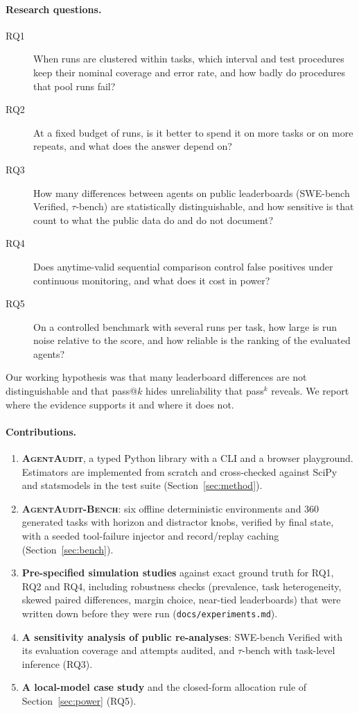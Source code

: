 \paragraph{Research questions.}
\begin{description}
\item[RQ1] When runs are clustered within tasks, which interval and test procedures keep their nominal coverage and error rate, and how badly do procedures that pool runs fail?
\item[RQ2] At a fixed budget of runs, is it better to spend it on more tasks or on more repeats, and what does the answer depend on?
\item[RQ3] How many differences between agents on public leaderboards (SWE-bench Verified, $\tau$-bench) are statistically distinguishable, and how sensitive is that count to what the public data do and do not document?
\item[RQ4] Does anytime-valid sequential comparison control false positives under continuous monitoring, and what does it cost in power?
\item[RQ5] On a controlled benchmark with several runs per task, how large is run noise relative to the score, and how reliable is the ranking of the evaluated agents?
\end{description}
Our working hypothesis was that many leaderboard differences are not distinguishable and that pass@$k$ hides unreliability that pass$^k$ reveals. We report where the evidence supports it and where it does not.

\paragraph{Contributions.}
\begin{enumerate}
\item \textbf{\textsc{AgentAudit}}, a typed Python library with a CLI and a browser playground. Estimators are implemented from scratch and cross-checked against SciPy and statsmodels in the test suite (Section~\ref{sec:method}).
\item \textbf{\textsc{AgentAudit-Bench}}: six offline deterministic environments and 360 generated tasks with horizon and distractor knobs, verified by final state, with a seeded tool-failure injector and record/replay caching (Section~\ref{sec:bench}).
\item \textbf{Pre-specified simulation studies} against exact ground truth for RQ1, RQ2 and RQ4, including robustness checks (prevalence, task heterogeneity, skewed paired differences, margin choice, near-tied leaderboards) that were written down before they were run (\texttt{docs/experiments.md}).
\item \textbf{A sensitivity analysis of public re-analyses}: SWE-bench Verified with its evaluation coverage and attempts audited, and $\tau$-bench with task-level inference (RQ3).
\item \textbf{A local-model case study} and the closed-form allocation rule of Section~\ref{sec:power} (RQ5).
\end{enumerate}

